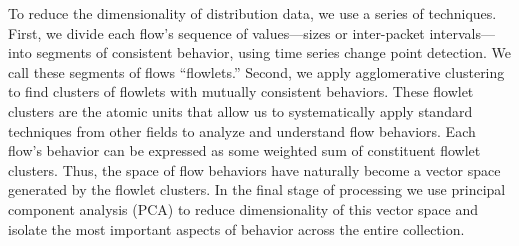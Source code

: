 \documentclass[conference]{IEEEtran}
\newcommand{\caps}[1]{{\small{#1}}}
\newcommand{\todo}[1]{[\textit{\textbf{TODO}: {#1}}]}
\begin{document}

To reduce the dimensionality of distribution data, we use a series of techniques.
First, we divide each flow's sequence of values---sizes or inter-packet intervals---into segments of consistent behavior, using time series change point detection. We call these segments of flows ``flowlets.'' Second, we apply agglomerative clustering to find clusters of flowlets with mutually consistent behaviors. These flowlet clusters are the atomic units that allow us to systematically apply standard techniques from other fields to analyze and understand flow behaviors. Each flow's behavior can be expressed as some weighted sum of constituent flowlet clusters. Thus, the space of flow behaviors have naturally become a vector space generated by the flowlet clusters. In the final stage of processing we use principal component analysis (\caps{PCA}) to reduce dimensionality of this vector space and isolate the most important aspects of behavior across the entire collection.


\end{document}
